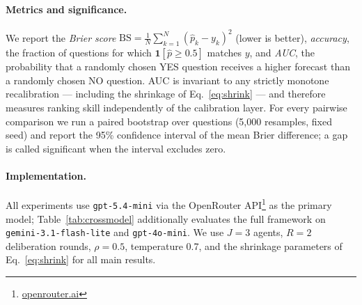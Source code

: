 \paragraph{Metrics and significance.}
We report the \textit{Brier score} $\mathrm{BS} = \frac{1}{N}\sum_{k=1}^{N}(\hat{p}_k - y_k)^2$ (lower is better), \textit{accuracy}, the fraction of questions for which $\mathbf{1}[\hat{p} \geq 0.5]$ matches $y$, and \textit{AUC}, the probability that a randomly chosen YES question receives a higher forecast than a randomly chosen NO question.
AUC is invariant to any strictly monotone recalibration --- including the shrinkage of Eq.~\eqref{eq:shrink} --- and therefore measures ranking skill independently of the calibration layer.
For every pairwise comparison we run a paired bootstrap over questions (5{,}000 resamples, fixed seed) and report the 95\% confidence interval of the mean Brier difference; a gap is called significant when the interval excludes zero.

\paragraph{Implementation.}
All experiments use \texttt{gpt-5.4-mini} via the OpenRouter API\footnote{\href{https://openrouter.ai/}{openrouter.ai}} as the primary model; Table~\ref{tab:crossmodel} additionally evaluates the full framework on \texttt{gemini-3.1-flash-lite} and \texttt{gpt-4o-mini}.
We use $J=3$ agents, $R=2$ deliberation rounds, $\rho=0.5$, temperature 0.7, and the shrinkage parameters of Eq.~\eqref{eq:shrink} for all main results.
